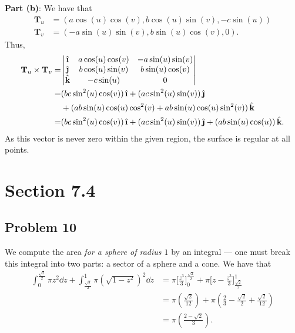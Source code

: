 \documentclass[11pt]{article}
\newcommand{\uvec}[1]{\mathop{} \!\hat{\textbf{#1}}}
\begin{document}
\textbf{Part (b)}: We have that
\begin{align*}
	\mathbf{T}_{u} &= (a \cos(u) \cos(v), b \cos(u) \sin(v), -c \sin(u)) \\
	\mathbf{T}_{v} &= (- a \sin(u) \sin(v), b \sin(u) \cos(v), 0).
\end{align*}
Thus, 
\begin{align*}
	\mathbf{T}_{u} \times \mathbf{T}_{v} =& \begin{vmatrix}  \uvec{\i} & a \cos(u) \cos(v) & - a \sin(u) \sin(v) \\ \uvec{\j} & b \cos(u) \sin(v) & b \sin(u) \cos(v) \\ \uvec{k} & -c \sin(u) & 0 \end{vmatrix} \\
	=& (bc \sin^{2}(u) \cos(v)) \uvec{\i} + (ac \sin^{2}(u)\sin(v)) \uvec{\j} \\ 
	 &+ (ab \sin(u) \cos(u) \cos^{2}(v) + ab \sin(u) \cos(u) \sin^{2}(v)) \uvec{k} \\
	=& (bc \sin^{2}(u) \cos(v)) \uvec{\i} + (ac \sin^{2}(u)\sin(v)) \uvec{\j} + (ab \sin(u) \cos(u)) \uvec{k}.
\end{align*}
As this vector is never zero within the given region, the surface is regular at all points.


\section{Section 7.4}


\subsection*{Problem 10}

We compute the area \textit{for a sphere of radius $1$} by an integral --- one must break this integral into two parts: a sector of a sphere and a cone. We have that
\begin{align*}
	\int_{0}^{\tfrac{\sqrt{2}}{2}} \pi z^{2} \dd{z} + \int_{\tfrac{\sqrt{2}}{2}}^{1} \pi (\sqrt{1 - z^{2}})^{2} \dd{z} &= \pi \Big[ \frac{z^{3}}{3} \Big]_{0}^{\tfrac{\sqrt{2}}{2}} + \pi \Big[ z - \frac{z^{3}}{3} \Big]_{\tfrac{\sqrt{2}}{2}}^{1}\\
	&= \pi \left( \frac{\sqrt{2}}{12} \right) + \pi \left( \frac{2}{3} - \frac{\sqrt{2}}{2} + \frac{\sqrt{2}}{12} \right) \\
	&= \pi \left( \frac{2 -  \sqrt{2}}{3} \right).
\end{align*}
\end{document}
